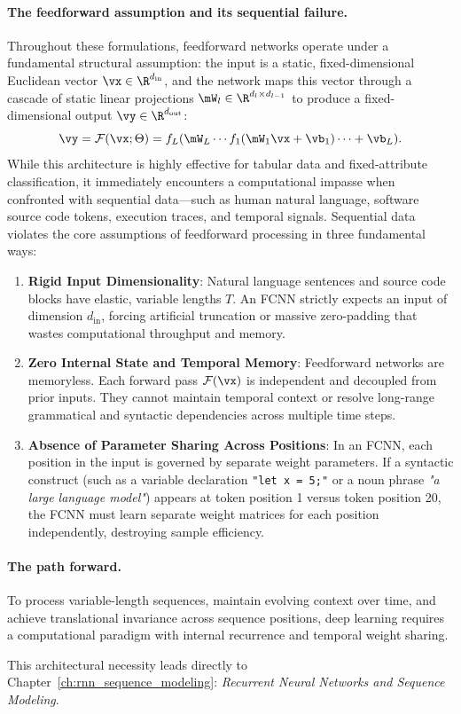 \documentclass[../../main.tex]{subfiles}
\begin{document}
\paragraph{The feedforward assumption and its sequential failure.}
Throughout these formulations, feedforward networks operate under a fundamental structural assumption: the input is a static, fixed-dimensional Euclidean vector $\vx \in \R^{d_{\text{in}}}$, and the network maps this vector through a cascade of static linear projections $\mW_l \in \R^{d_l \times d_{l-1}}$ to produce a fixed-dimensional output $\vy \in \R^{d_{\text{out}}}$:
\begin{equation}
\label{eq:fcnn_static_cascade}
\vy = \mathcal{F}(\vx; \Theta) = f_L(\mW_L \cdots f_1(\mW_1 \vx + \vb_1) \cdots + \vb_L).
\end{equation}
While this architecture is highly effective for tabular data and fixed-attribute classification, it immediately encounters a computational impasse when confronted with sequential data—such as human natural language, software source code tokens, execution traces, and temporal signals. Sequential data violates the core assumptions of feedforward processing in three fundamental ways:
\begin{enumerate}
    \item \textbf{Rigid Input Dimensionality}: Natural language sentences and source code blocks have elastic, variable lengths $T$. An FCNN strictly expects an input of dimension $d_{\text{in}}$, forcing artificial truncation or massive zero-padding that wastes computational throughput and memory.
    \item \textbf{Zero Internal State and Temporal Memory}: Feedforward networks are memoryless. Each forward pass $\mathcal{F}(\vx)$ is independent and decoupled from prior inputs. They cannot maintain temporal context or resolve long-range grammatical and syntactic dependencies across multiple time steps.
    \item \textbf{Absence of Parameter Sharing Across Positions}: In an FCNN, each position in the input is governed by separate weight parameters. If a syntactic construct (such as a variable declaration \texttt{"let x = 5;"} or a noun phrase \textit{"a large language model"}) appears at token position 1 versus token position 20, the FCNN must learn separate weight matrices for each position independently, destroying sample efficiency.
\end{enumerate}

\paragraph{The path forward.}
To process variable-length sequences, maintain evolving context over time, and achieve translational invariance across sequence positions, deep learning requires a computational paradigm with internal recurrence and temporal weight sharing.

This architectural necessity leads directly to Chapter~\ref{ch:rnn_sequence_modeling}: \emph{Recurrent Neural Networks and Sequence Modeling}.
\end{document}
